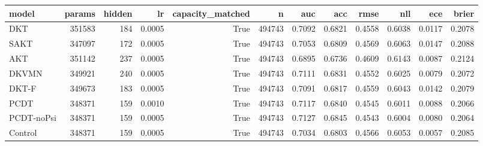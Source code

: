 \begin{tabular}{lrrrrrrrrrrr}
\toprule
model & params & hidden & lr & capacity\_matched & n & auc & acc & rmse & nll & ece & brier \\
\midrule
DKT & 351583 & 184 & 0.0005 & True & 494743 & 0.7092 & 0.6821 & 0.4558 & 0.6038 & 0.0117 & 0.2078 \\
SAKT & 347097 & 172 & 0.0005 & True & 494743 & 0.7053 & 0.6809 & 0.4569 & 0.6063 & 0.0147 & 0.2088 \\
AKT & 351142 & 237 & 0.0005 & True & 494743 & 0.6895 & 0.6736 & 0.4609 & 0.6143 & 0.0087 & 0.2124 \\
DKVMN & 349921 & 240 & 0.0005 & True & 494743 & 0.7111 & 0.6831 & 0.4552 & 0.6025 & 0.0079 & 0.2072 \\
DKT-F & 349673 & 183 & 0.0005 & True & 494743 & 0.7091 & 0.6817 & 0.4559 & 0.6043 & 0.0142 & 0.2079 \\
PCDT & 348371 & 159 & 0.0010 & True & 494743 & 0.7117 & 0.6840 & 0.4545 & 0.6011 & 0.0088 & 0.2066 \\
PCDT-noPsi & 348371 & 159 & 0.0005 & True & 494743 & 0.7127 & 0.6845 & 0.4543 & 0.6004 & 0.0080 & 0.2064 \\
Control & 348371 & 159 & 0.0005 & True & 494743 & 0.7034 & 0.6803 & 0.4566 & 0.6053 & 0.0057 & 0.2085 \\
\bottomrule
\end{tabular}
